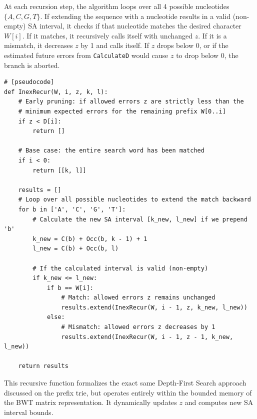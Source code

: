 At each recursion step, the algorithm loops over all 4 possible nucleotides $\{A, C, G, T\}$. If extending the sequence with a nucleotide results in a valid (non-empty) SA interval, it checks if that nucleotide matches the desired character $W[i]$. If it matches, it recursively calls itself with unchanged $z$. If it is a mismatch, it decreases $z$ by 1 and calls itself. If $z$ drops below 0, or if the estimated future errors from \texttt{CalculateD} would cause $z$ to drop below 0, the branch is aborted.

\begin{verbatim}
# [pseudocode]
def InexRecur(W, i, z, k, l):
    # Early pruning: if allowed errors z are strictly less than the
    # minimum expected errors for the remaining prefix W[0..i]
    if z < D[i]:
        return []

    # Base case: the entire search word has been matched
    if i < 0:
        return [[k, l]]

    results = []
    # Loop over all possible nucleotides to extend the match backward
    for b in ['A', 'C', 'G', 'T']:
        # Calculate the new SA interval [k_new, l_new] if we prepend 'b'
        k_new = C(b) + Occ(b, k - 1) + 1
        l_new = C(b) + Occ(b, l)

        # If the calculated interval is valid (non-empty)
        if k_new <= l_new:
            if b == W[i]:
                # Match: allowed errors z remains unchanged
                results.extend(InexRecur(W, i - 1, z, k_new, l_new))
            else:
                # Mismatch: allowed errors z decreases by 1
                results.extend(InexRecur(W, i - 1, z - 1, k_new, l_new))

    return results
\end{verbatim}

This recursive function formalizes the exact same Depth-First Search approach discussed on the prefix trie, but operates entirely within the bounded memory of the BWT matrix representation. It dynamically updates $z$ and computes new SA interval bounds.

